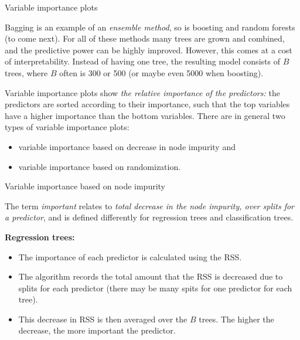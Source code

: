 \documentclass[10pt,ignorenonframetext,]{beamer}
\providecommand{\tightlist}{%
  \setlength{\itemsep}{0pt}\setlength{\parskip}{0pt}}
\begin{document}
\begin{frame}

\begin{block}{Variable importance plots}

Bagging is an example of an \emph{ensemble method}, so is boosting and
random forests (to come next). For all of these methods many trees are
grown and combined, and the predictive power can be highly improved.
However, this comes at a cost of interpretability. Instead of having one
tree, the resulting model consists of \(B\) trees, where \(B\) often is
300 or 500 (or maybe even 5000 when boosting).

Variable importance plots show \emph{the relative importance of the
predictors:} the predictors are sorted according to their importance,
such that the top variables have a higher importance than the bottom
variables. There are in general two types of variable importance plots:

\begin{itemize}
\tightlist
\item
  variable importance based on decrease in node impurity and
\item
  variable importance based on randomization.
\end{itemize}

\end{block}

\end{frame}

\begin{frame}

\begin{block}{Variable importance based on node impurity}

The term \emph{important} relates to \emph{total decrease in the node
impurity, over splits for a predictor}, and is defined differently for
regression trees and classification trees.

\textbf{Regression trees:}

\begin{itemize}
\tightlist
\item
  The importance of each predictor is calculated using the RSS.
\item
  The algorithm records the total amount that the RSS is decreased due
  to splits for each predictor (there may be many spits for one
  predictor for each tree).
\item
  This decrease in RSS is then averaged over the \(B\) trees. The higher
  the decrease, the more important the predictor.
\end{itemize}

\end{block}

\end{frame}
\end{document}
